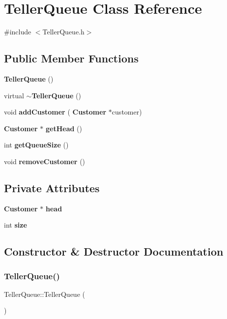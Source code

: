 \section{Teller\+Queue Class Reference}
\label{classTellerQueue}


{\ttfamily \#include $<$Teller\+Queue.\+h$>$}

\subsection*{Public Member Functions}
\begin{DoxyCompactItemize}
\item 
\textbf{ Teller\+Queue} ()
\item 
virtual \textbf{ $\sim$\+Teller\+Queue} ()
\item 
void \textbf{ add\+Customer} (\textbf{ Customer} $\ast$customer)
\item 
\textbf{ Customer} $\ast$ \textbf{ get\+Head} ()
\item 
int \textbf{ get\+Queue\+Size} ()
\item 
void \textbf{ remove\+Customer} ()
\end{DoxyCompactItemize}
\subsection*{Private Attributes}
\begin{DoxyCompactItemize}
\item 
\textbf{ Customer} $\ast$ \textbf{ head}
\item 
int \textbf{ size}
\end{DoxyCompactItemize}


\subsection{Constructor \& Destructor Documentation}
\mbox{\label{classTellerQueue_a11d0c867f834ac7a2215013cea9d68fe}} 
\subsubsection{Teller\+Queue()}
{\footnotesize\ttfamily Teller\+Queue\+::\+Teller\+Queue (\begin{DoxyParamCaption}{ }\end{DoxyParamCaption})}



